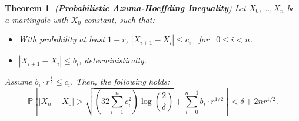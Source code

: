 \documentclass{article}
\newtheorem*{theorem*}{Theorem}
\begin{document}
\newpage
\begin{theorem*}(\textbf{Probabilistic Azuma-Hoeffding Inequality}) \cite{Shamir1987}
    Let \( X_0, \ldots, X_n \) be a martingale with \( X_0 \) constant, such that:
    \begin{itemize}
        \item[(i)] With probability at least \(  1 - r \), \( |X_{i+1} - X_i| \leq c_i \) \, for \, \( 0 \leq i < n \).
        \item[(ii)] \( |X_{i+1} - X_i| \leq b_i \), deterministically.
    \end{itemize}
    Assume \(b_i \cdot r^{\frac{1}{2}} \le c_i\). Then, the following holds:
    \begin{equation}
        \mathbb{P}\left[ |X_n - X_0| > \sqrt{\left(32\sum_{i=1}^{n} c_i^2\right)\log\left(\frac{2}{\delta}\right)} + \sum_{i=0}^{n-1} b_i \cdot r^{1/2} \right] < \delta + 2n r^{1/2}.
    \end{equation}
\end{theorem*}
\end{document}
